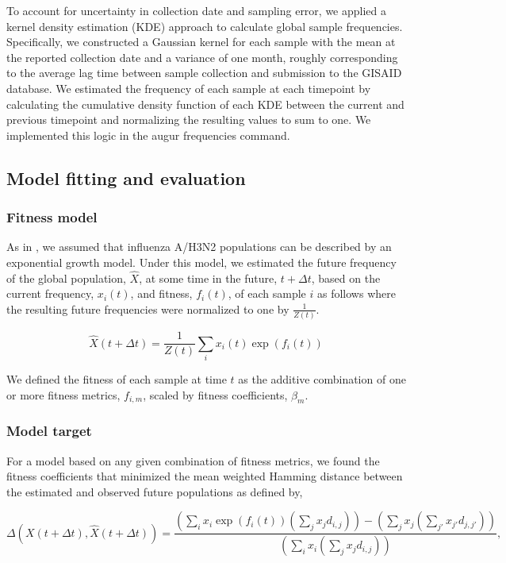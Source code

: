 To account for uncertainty in collection date and sampling error, we applied a kernel density estimation (KDE) approach to calculate global sample frequencies.
Specifically, we constructed a Gaussian kernel for each sample with the mean at the reported collection date and a variance of one month, roughly corresponding to the average lag time between sample collection and submission to the GISAID database.
We estimated the frequency of each sample at each timepoint by calculating the cumulative density function of each KDE between the current and previous timepoint and normalizing the resulting values to sum to one.
We implemented this logic in the augur frequencies command.

\subsection*{Model fitting and evaluation}

\subsubsection*{Fitness model}

As in \cite{Luksza:2014hj}, we assumed that influenza A/H3N2 populations can be described by an exponential growth model.
Under this model, we estimated the future frequency of the global population, $\hat{X}$, at some time in the future, $t + \Delta{t}$, based on the current frequency, $x_{i}(t)$, and fitness, $f_{i}(t)$, of each sample $i$ as follows where the resulting future frequencies were normalized to one by $\frac{1}{Z(t)}$.

$$
\hat{X}(t + \Delta{t}) = \frac{1}{Z(t)}\sum_{i}x_{i}(t)\exp(f_{i}(t))
$$

We defined the fitness of each sample at time $t$ as the additive combination of one or more fitness metrics, $f_{i,m}$, scaled by fitness coefficients, $\beta_{m}$.

\subsubsection*{Model target}

For a model based on any given combination of fitness metrics, we found the fitness coefficients that minimized the mean weighted Hamming distance between the estimated and observed future populations as defined by,

$$
\Delta(X(t + \Delta{t}), \hat{X}(t + \Delta{t})) = \frac{(\sum_{i}x_{i}\exp(f_{i}(t))(\sum_{j}x_{j}d_{i,j})) - (\sum_{j}x_{j}(\sum_{j'}x_{j'}d_{j,j'}))}{(\sum_{i}x_{i}(\sum_{j}x_{j}d_{i,j}))},
$$

